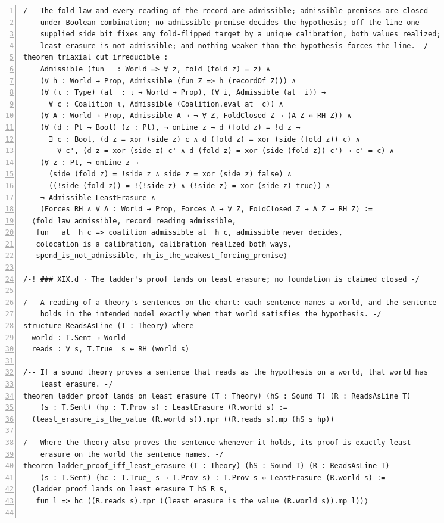 \documentclass[10pt]{article}
\newcommand{\leansize}{\fontsize{5.5pt}{6.75pt}\selectfont}
\begin{document}
\begin{multicols}{2}
\begin{Verbatim}[numbers=left,firstnumber=1,numbersep=3pt,xleftmargin=2.6em,breaklines=true,breakanywhere=true,breakautoindent=false,breakindent=1.4em,breaksymbolleft={},breakanywheresymbolpre={},fontsize=\leansize]
/-- The fold law and every reading of the record are admissible; admissible premises are closed
    under Boolean combination; no admissible premise decides the hypothesis; off the line one
    supplied side bit fixes any fold-flipped target by a unique calibration, both values realized;
    least erasure is not admissible; and nothing weaker than the hypothesis forces the line. -/
theorem triaxial_cut_irreducible :
    Admissible (fun _ : World => ∀ z, fold (fold z) = z) ∧
    (∀ h : World → Prop, Admissible (fun Z => h (recordOf Z))) ∧
    (∀ (ι : Type) (at_ : ι → World → Prop), (∀ i, Admissible (at_ i)) →
      ∀ c : Coalition ι, Admissible (Coalition.eval at_ c)) ∧
    (∀ A : World → Prop, Admissible A → ¬ ∀ Z, FoldClosed Z → (A Z ↔ RH Z)) ∧
    (∀ (d : Pt → Bool) (z : Pt), ¬ onLine z → d (fold z) = !d z →
      ∃ c : Bool, (d z = xor (side z) c ∧ d (fold z) = xor (side (fold z)) c) ∧
        ∀ c', (d z = xor (side z) c' ∧ d (fold z) = xor (side (fold z)) c') → c' = c) ∧
    (∀ z : Pt, ¬ onLine z →
      (side (fold z) = !side z ∧ side z = xor (side z) false) ∧
      ((!side (fold z)) = !(!side z) ∧ (!side z) = xor (side z) true)) ∧
    ¬ Admissible LeastErasure ∧
    (Forces RH ∧ ∀ A : World → Prop, Forces A → ∀ Z, FoldClosed Z → A Z → RH Z) :=
  ⟨fold_law_admissible, record_reading_admissible,
   fun _ at_ h c => coalition_admissible at_ h c, admissible_never_decides,
   colocation_is_a_calibration, calibration_realized_both_ways,
   spend_is_not_admissible, rh_is_the_weakest_forcing_premise⟩

/-! ### XIX.d · The ladder's proof lands on least erasure; no foundation is claimed closed -/

/-- A reading of a theory's sentences on the chart: each sentence names a world, and the sentence
    holds in the intended model exactly when that world satisfies the hypothesis. -/
structure ReadsAsLine (T : Theory) where
  world : T.Sent → World
  reads : ∀ s, T.True_ s ↔ RH (world s)

/-- If a sound theory proves a sentence that reads as the hypothesis on a world, that world has
    least erasure. -/
theorem ladder_proof_lands_on_least_erasure (T : Theory) (hS : Sound T) (R : ReadsAsLine T)
    (s : T.Sent) (hp : T.Prov s) : LeastErasure (R.world s) :=
  (least_erasure_is_the_value (R.world s)).mpr ((R.reads s).mp (hS s hp))

/-- Where the theory also proves the sentence whenever it holds, its proof is exactly least
    erasure on the world the sentence names. -/
theorem ladder_proof_iff_least_erasure (T : Theory) (hS : Sound T) (R : ReadsAsLine T)
    (s : T.Sent) (hc : T.True_ s → T.Prov s) : T.Prov s ↔ LeastErasure (R.world s) :=
  ⟨ladder_proof_lands_on_least_erasure T hS R s,
   fun l => hc ((R.reads s).mpr ((least_erasure_is_the_value (R.world s)).mp l))⟩


\end{Verbatim}
\end{multicols}
\end{document}
